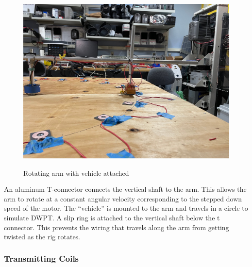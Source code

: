 \begin{figure}
    \begin{center}
    \includegraphics[width=5in]{fig6.jpg}
    \end{center}
    \renewcommand{\baselinestretch}{1}
    \small\normalsize
    \begin{quote}
    \caption[Rotating arm with vehicle attached]{Rotating arm with vehicle attached} \label{fig: f6}
    \end{quote}
\end{figure}

An aluminum T-connector connects the vertical shaft to the arm. This allows the arm to rotate at a 
constant angular velocity corresponding to the stepped down speed of the motor. The “vehicle” is 
mounted to the arm and travels in a circle to simulate DWPT. A slip ring is attached to the vertical 
shaft below the t connector. This prevents the wiring that travels along the arm from getting twisted 
as the rig rotates. 

\subsubsection{Transmitting Coils}

